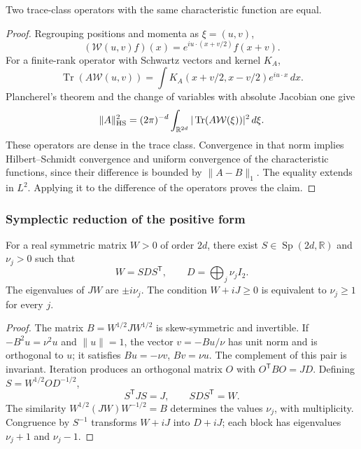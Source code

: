 \begin{lemma}
\label{md:antmem:gauss:lem:unicidad-weyl}
Two trace-class operators with the same characteristic function are equal.
\end{lemma}
\begin{proof}
Regrouping positions and momenta as \(\xi=(u,v)\),
\[
 (\mathcal W(u,v)f)(x)=e^{iu\cdot(x+v/2)}f(x+v).
\]
For a finite-rank operator with Schwartz vectors and kernel \(K_A\),
\[
 \operatorname{Tr}(A\mathcal W(u,v))=\int K_A(x+v/2,x-v/2)e^{iu\cdot x}\,dx.
\]
Plancherel's theorem and the change of variables with absolute Jacobian one give
\[
 \|A\|_{\rm HS}^2=(2\pi)^{-d}\int_{\mathbb R^{2d}}
 |\operatorname{Tr}(A\mathcal W(\xi))|^2\,d\xi.
\]
These operators are dense in the trace class. Convergence
in that norm implies Hilbert--Schmidt convergence and uniform
convergence of the characteristic functions, since their difference is
bounded by \(\|A-B\|_1\). The equality extends in \(L^2\).
Applying it to the difference of the operators proves the claim.
\end{proof}

\subsubsection{Symplectic reduction of the positive form}
\begin{theorem}
\label{md:antmem:gauss:thm:williamson}
For a real symmetric matrix \(W>0\) of order \(2d\), there exist
\(S\in\operatorname{Sp}(2d,\mathbb R)\) and \(\nu_j>0\) such that
\[
 W=SDS^{\mathsf T},\qquad D=\bigoplus_j\nu_jI_2.
\]
The eigenvalues of \(JW\) are \(\pm i\nu_j\). The condition
\(W+iJ\geq0\) is equivalent to \(\nu_j\geq1\) for every \(j\).
\end{theorem}
\begin{proof}
The matrix \(B=W^{1/2}JW^{1/2}\) is skew-symmetric and invertible.
If \(-B^2u=\nu^2u\) and \(\|u\|=1\), the vector
\(v=-Bu/\nu\) has unit norm and is orthogonal to \(u\); it satisfies
\(Bu=-\nu v\), \(Bv=\nu u\). The complement of this pair is
invariant. Iteration produces an orthogonal matrix \(O\) with
\(O^{\mathsf T}BO=JD\). Defining \(S=W^{1/2}OD^{-1/2}\),
\[
 S^{\mathsf T}JS=J,\qquad SDS^{\mathsf T}=W.
\]
The similarity \(W^{1/2}(JW)W^{-1/2}=B\) determines the values
\(\nu_j\), with multiplicity. Congruence by \(S^{-1}\)
transforms \(W+iJ\) into \(D+iJ\); each block has eigenvalues
\(\nu_j+1\) and \(\nu_j-1\).
\end{proof}

